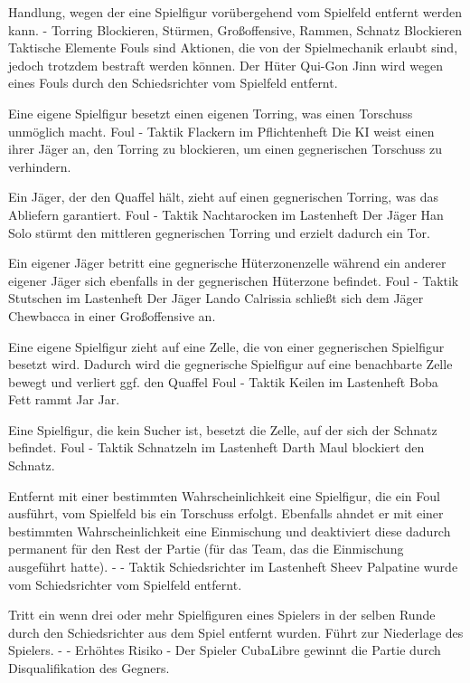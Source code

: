 {Handlung, wegen der eine Spielfigur vorübergehend vom Spielfeld entfernt werden kann.}
{-}
{Torring Blockieren, Stürmen, Großoffensive, Rammen, Schnatz Blockieren}
{Taktische Elemente}
{Fouls sind Aktionen, die von der Spielmechanik erlaubt sind, jedoch trotzdem bestraft werden können.}
{Der Hüter \glqq{}Qui-Gon Jinn\grqq{} wird wegen eines Fouls durch den Schiedsrichter vom Spielfeld entfernt.}

{Eine eigene Spielfigur besetzt einen eigenen Torring, was einen Torschuss unmöglich macht.}
{Foul}
{-}
{Taktik}
{\glqq{}Flackern\grqq{}  im Pflichtenheft}
{Die KI weist einen ihrer Jäger an, den Torring zu blockieren, um einen gegnerischen Torschuss zu verhindern.}

{Ein Jäger, der den Quaffel hält, zieht auf einen gegnerischen Torring, was das Abliefern garantiert.}
{Foul}
{-}
{Taktik}
{\glqq{}Nachtarocken\grqq{}  im Lastenheft}
{Der Jäger \glqq{}Han Solo\grqq{} stürmt den mittleren gegnerischen Torring und erzielt dadurch ein Tor.}

{Ein eigener Jäger betritt eine gegnerische Hüterzonenzelle während ein anderer eigener Jäger sich ebenfalls in der gegnerischen Hüterzone befindet.}
{Foul}
{-}
{Taktik}
{\glqq{}Stutschen\grqq{}  im Lastenheft}
{Der Jäger \glqq{}Lando Calrissia\grqq{} schließt sich dem Jäger \glqq{}Chewbacca\grqq{} in einer Großoffensive an.}

{Eine eigene Spielfigur zieht auf eine Zelle, die von einer gegnerischen Spielfigur besetzt wird. Dadurch wird die gegnerische Spielfigur auf eine benachbarte Zelle bewegt und verliert ggf. den Quaffel}
{Foul}
{-}
{Taktik}
{\glqq{}Keilen\grqq{}  im Lastenheft}
{\glqq{}Boba Fett\grqq{} rammt \glqq{}Jar Jar\grqq{}.}

{Eine Spielfigur, die kein Sucher ist, besetzt die Zelle, auf der sich der Schnatz befindet.}
{Foul}
{-}
{Taktik}
{\glqq{}Schnatzeln\grqq{}  im Lastenheft}
{\glqq{}Darth Maul\grqq{} blockiert den Schnatz.}

{Entfernt mit einer bestimmten Wahrscheinlichkeit eine Spielfigur, die ein Foul ausführt, vom Spielfeld bis ein Torschuss erfolgt. Ebenfalls ahndet er mit einer bestimmten Wahrscheinlichkeit eine Einmischung  und deaktiviert diese dadurch permanent für den Rest der Partie (für das Team, das die Einmischung ausgeführt hatte).}
{-}
{-}
{Taktik}
{\glqq{}Schiedsrichter\grqq{}  im Lastenheft}
{\glqq{}Sheev Palpatine\grqq{} wurde vom Schiedsrichter vom Spielfeld entfernt.}

{Tritt ein wenn drei oder mehr Spielfiguren eines Spielers in der selben Runde durch den Schiedsrichter aus dem Spiel entfernt wurden. Führt zur Niederlage des Spielers.}
{-}
{-}
{Erhöhtes Risiko}
{-}
{Der Spieler \glqq{}CubaLibre\grqq{} gewinnt die Partie durch Disqualifikation des Gegners.}
